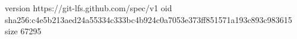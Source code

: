 version https://git-lfs.github.com/spec/v1
oid sha256:c4e5b213aed24a55334c333bc4b924c0a7053e373ff851571a193c893c983615
size 67295
